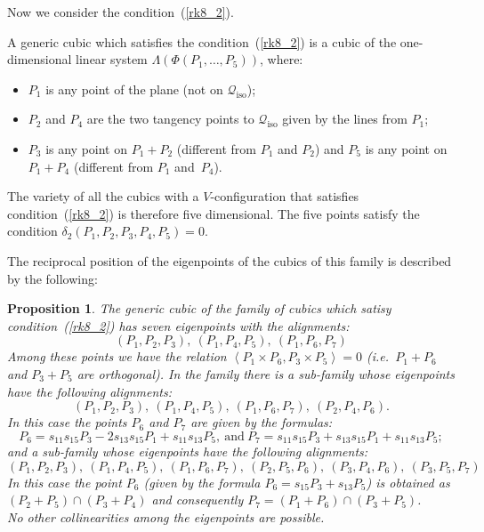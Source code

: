 \documentclass{amsart}
\theoremstyle{plain}
\newtheorem{prop}[lemma]{Proposition}
\theoremstyle{definition}
\newcommand{\iso}{\mathcal{Q}_{\mathrm{iso}}}
\newcommand{\scl}[2]{\left\langle {#1}, {#2} \right\rangle}
\begin{document}
Now we consider the condition~(\ref{rk8_2}).

%
A generic cubic which satisfies the condition~(\ref{rk8_2}) is
a cubic of the one-dimensional linear system
$\Lambda(\Phi(P_1, \dotsc, P_5))$, where:
\begin{itemize}
\item $P_1$ is any point of the plane (not on $\iso$);
\item $P_2$ and $P_4$ are the two tangency points to $\iso$ given by the lines
from $P_1$;
\item $P_3$ is any point on  $P_1+P_2$ (different from $P_1$ and $P_2$)
and $P_5$ is any point on $P_1+P_4$ (different from $P_1$ and~$P_4$).
\end{itemize}

The variety of all the cubics with a $V$-configuration
that
satisfies condition~(\ref{rk8_2}) is therefore five dimensional.
The five points satisfy the condition $\delta_2(P_1, P_2, P_3, P_4, P_5) = 0$.


The reciprocal position of the eigenpoints of the cubics of this family
is described by the following:
%
\begin{prop}
\label{prop:rk8_2B}
The generic cubic of the family of cubics which satisy condition~(\ref{rk8_2})
has seven eigenpoints with the alignments:
\[
(P_1, P_2, P_3), \ (P_1, P_4, P_5), \ (P_1, P_6, P_7)
\]
Among these points we have the relation
$\scl{P_1 \times P_6}{P_3\times P_5}=0$
(i.e.\ $P_1+P_6$ and $P_3+P_5$ are orthogonal).
In the family there is a sub-family whose eigenpoints have the following
alignments:
\[
(P_1, P_2, P_3),\  (P_1, P_4, P_5),\  (P_1, P_6, P_7),\  (P_2, P_4, P_6).
\]
In this case the points $P_6$ and $P_7$ are given by the formulas:
\[P_6 = s_{11}s_{15}P_3-2s_{13}s_{15}P_1+s_{11}s_{13}P_5, \ \mbox{and} \
P_7 = s_{11}s_{15}P_3+s_{13}s_{15}P_1+s_{11}s_{13}P_5;
\]
and a sub-family whose eigenpoints have the following
alignments:
\[
(P_1, P_2, P_3),\  (P_1, P_4, P_5), \ (P_1, P_6, P_7),\  (P_2, P_5, P_6),\
(P_3, P_4, P_6),\  (P_3, P_5, P_7)
\]
In this case the point $P_6$ (given by the formula
$P_6 = s_{15}P_3+s_{13}P_5$) is obtained as
$(P_2+P_5) \cap (P_3+P_4)$ and consequently
$P_7 = (P_1+P_6) \cap (P_3+P_5)$.\\
No other collinearities among the eigenpoints are possible.
\end{prop}
\end{document}
